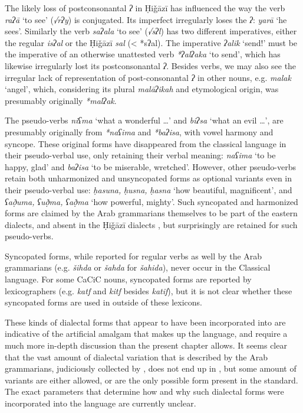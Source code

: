 \documentclass[output=paper]{langsci/langscibook}
\begin{document}
The likely loss of postconsonantal \textit{ʔ} in Ḥiǧāzī  has influenced the way the verb \textit{raʔā} ‘to see’ (\textit{√rʔy}) is conjugated. Its imperfect irregularly loses the \textit{ʔ}: \textit{yarā} ‘he sees’. Similarly the verb \textit{saʔala} ‘to see’ (\textit{√sʔl}) has two different imperatives, either the regular \textit{isʔal} or the Ḥiǧāzī \textit{sal} (< *sʔal). The imperative \textit{ʔalik} ‘send!’ must be the imperative of an otherwise unattested verb \textit{*ʔalʔaka} ‘to send’, which has likewise irregularly lost its postconsonantal \textit{ʔ}. Besides verbs, we may also see the irregular lack of representation of post-consonantal \textit{ʔ} in other nouns, e.g. \textit{malak} ‘angel’, which, considering its plural \textit{malāʔikah} and etymological origin, was presumably originally \textit{*malʔak}.

The pseudo-verbs \textit{niʕma} ‘what a wonderful …’ and \textit{biʔsa} ‘what an evil …’, are presumably originally from \textit{*naʕima} and \textit{*baʔisa}, with vowel harmony and syncope. These original forms have disappeared from the classical language in their pseudo-verbal use, only retaining their verbal meaning: \textit{naʕima} ‘to be happy, glad’ and \textit{baʔisa} ‘to be miserable, wretched’. However, other pseudo-verbs retain both unharmonized and unsyncopated forms as optional variants even in their pseudo-verbal use: \textit{ḥasuna,} \textit{ḥusna,} \textit{ḥasna} ‘how beautiful, magnificent’, and \textit{ʕað̣uma,} \textit{ʕuð̣ma,} \textit{ʕað̣ma} ‘how powerful, mighty’. Such syncopated and harmonized forms are claimed by the Arab grammarians themselves to be part of the eastern dialects, and absent in the Ḥiǧāzī dialects \citep[97]{Rabin1951}, but surprisingly are retained for such pseudo-verbs.

Syncopated forms, while reported for regular verbs as well by the Arab grammarians (e.g. \textit{šihda} or \textit{šahda} for \textit{šahida}), never occur in the Classical language. For some CaCiC nouns, syncopated forms are reported by lexicographers (e.g. \textit{katf} and \textit{kitf} besides \textit{katif}), but it is not clear whether these syncopated forms are used in  outside of these lexicons.

These kinds of dialectal forms that appear to have been incorporated into  are indicative of the artificial amalgam that makes up the language, and require a much more in-depth discussion than the present chapter allows. It seems clear that the vast amount of dialectal variation that is described by the Arab grammarians, judiciously collected by \citet{Rabin1951}, does not end up in , but some amount of variants are either allowed, or are the only possible form present in the standard. The exact parameters that determine how and why such dialectal forms were incorporated into the language are currently unclear.
\end{document}
